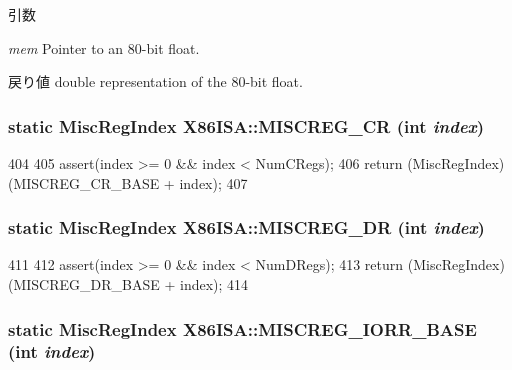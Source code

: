 \begin{DoxyParams}{引数}
\item[{\em mem}]Pointer to an 80-\/bit float. \end{DoxyParams}
\begin{DoxyReturn}{戻り値}
double representation of the 80-\/bit float. 
\end{DoxyReturn}
\hypertarget{namespaceX86ISA_a1d9390d2a9b1492e2f14c97e2db2ceed}{
\subsubsection[{MISCREG\_\-CR}]{\setlength{\rightskip}{0pt plus 5cm}static {\bf MiscRegIndex} X86ISA::MISCREG\_\-CR (int {\em index})}}
\label{namespaceX86ISA_a1d9390d2a9b1492e2f14c97e2db2ceed}



\begin{DoxyCode}
404     {
405         assert(index >= 0 && index < NumCRegs);
406         return (MiscRegIndex)(MISCREG_CR_BASE + index);
407     }
\end{DoxyCode}
\hypertarget{namespaceX86ISA_ac1e3294c84d21bbaf4bd955237fd8e19}{
\subsubsection[{MISCREG\_\-DR}]{\setlength{\rightskip}{0pt plus 5cm}static {\bf MiscRegIndex} X86ISA::MISCREG\_\-DR (int {\em index})}}
\label{namespaceX86ISA_ac1e3294c84d21bbaf4bd955237fd8e19}



\begin{DoxyCode}
411     {
412         assert(index >= 0 && index < NumDRegs);
413         return (MiscRegIndex)(MISCREG_DR_BASE + index);
414     }
\end{DoxyCode}
\hypertarget{namespaceX86ISA_ae947cc3d36a3597e5396c8b7824d2b2b}{
\subsubsection[{MISCREG\_\-IORR\_\-BASE}]{\setlength{\rightskip}{0pt plus 5cm}static {\bf MiscRegIndex} X86ISA::MISCREG\_\-IORR\_\-BASE (int {\em index})}}
\label{namespaceX86ISA_ae947cc3d36a3597e5396c8b7824d2b2b}




